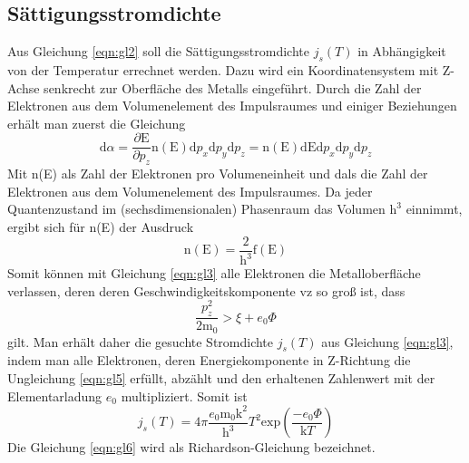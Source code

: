 \subsection{Sättigungsstromdichte}
Aus Gleichung \ref{eqn:gl2} soll die Sättigungsstromdichte $j_s(T)$ in Abhängigkeit von der Temperatur errechnet werden.
Dazu wird ein Koordinatensystem mit Z-Achse senkrecht zur Oberfläche des Metalls eingeführt.
Durch die Zahl der Elektronen aus dem Volumenelement des Impulsraumes und einiger Beziehungen erhält man zuerst die Gleichung
\begin{equation}
    \text{d}\alpha = \frac{\partial \text{E}}{\partial p_z} \text{n}(\text{E}) \text{d}p_x \text{d}p_y \text{d}p_z = \text{n}(\text{E}) \text{d}\text{E} \text{d}p_x \text{d}p_y \text{d}p_z
    \label{eqn:gl3}
\end{equation}
Mit n(E) als Zahl der Elektronen pro Volumeneinheit und d\alpha als die Zahl der Elektronen aus dem Volumenelement des Impulsraumes.
Da jeder Quantenzustand im (sechsdimensionalen) Phasenraum das Volumen $\text{h}^3$ einnimmt, ergibt sich für n(E) der Ausdruck 
\begin{equation}
    \text{n}(\text{E}) = \frac{2}{\text{h}^3}\text{f}(\text{E})
    \label{eqn:gl4}
\end{equation}
Somit können mit Gleichung \ref{eqn:gl3} alle Elektronen die Metalloberfläche verlassen, deren deren Geschwindigkeitskomponente vz so groß ist, dass
\begin{equation}
    \frac{p_z^2}{2\text{m}_0} > \xi + e_0 \Phi
    \label{eqn:gl5}
\end{equation} 
gilt.
Man erhält daher die gesuchte Stromdichte $j_s(T)$ aus Gleichung \ref{eqn:gl3}, indem man alle Elektronen, deren Energiekomponente in Z-Richtung die Ungleichung \ref{eqn:gl5} erfüllt, abzählt und den erhaltenen Zahlenwert mit der Elementarladung $e_0$ multipliziert.
Somit ist 
\begin{equation}
    j_s(T) = 4 \pi \frac{e_0 \text{m}_0 \text{k}^2}{\text{h}^3}T^2 \text{exp}\left(\frac{-e_0 \Phi}{\text{k} T}\right)
    \label{eqn:gl6}
\end{equation}
Die Gleichung \ref{eqn:gl6} wird als Richardson-Gleichung bezeichnet.

